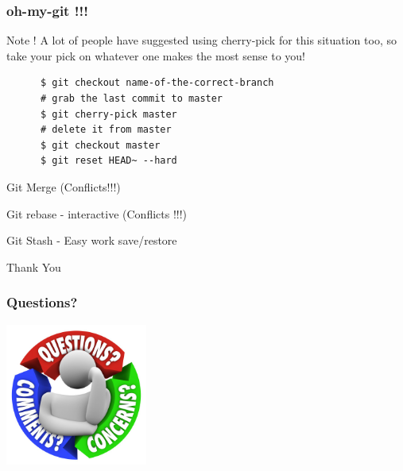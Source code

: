 \documentclass[10pt]{beamer}
\begin{document}
\begin{frame}[fragile]
  \frametitle{oh-my-git !!!}
  \begin{block}{Note !}
    A lot of people have suggested using cherry-pick for this situation too,
    so take your pick on whatever one makes the most sense to you!
  \end{block}
  \pause
  \begin{example}[Solution]
    \begin{verbatim}
      $ git checkout name-of-the-correct-branch
      # grab the last commit to master
      $ git cherry-pick master
      # delete it from master
      $ git checkout master
      $ git reset HEAD~ --hard
    \end{verbatim}
  \end{example}
\end{frame}

\begin{frame}
  \begin{center}
    \Huge{Git Merge (Conflicts!!!)}
  \end{center}
\end{frame}

\begin{frame}
  \begin{center}
    \Huge{Git rebase - interactive (Conflicts !!!)}
  \end{center}
\end{frame}

\begin{frame}
  \begin{center}
    \Huge{Git Stash - Easy work save/restore }
  \end{center}
\end{frame}

\begin{frame}
  \begin{center}
    \Huge{Thank You}
  \end{center}
\end{frame}

\begin{frame}
	\frametitle{Questions?}
	\begin{center}
	\includegraphics[width=0.35\textwidth]{q5.jpg}
	\end{center}
\end{frame}

\end{document}
